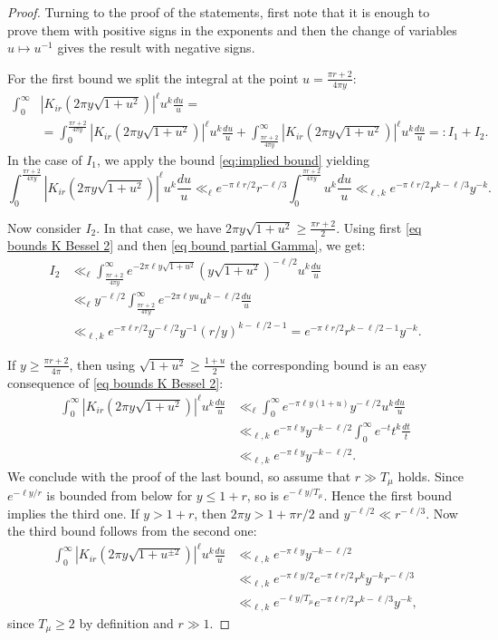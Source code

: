\documentclass[11pt, oneside]{amsart}
\theoremstyle{plain}
\theoremstyle{remark}
\newcommand{\abs}[1]{\left|#1\right|}
\begin{document}
\begin{proof}
Turning to the proof of the statements, first note that it is enough to prove them with positive signs in the exponents and then 
the change of variables $u\mapsto u^{-1}$ gives the result with negative signs. 

 For the first bound we split the integral at the point $u=\frac{\pi r+2}{4\pi y}$:
\begin{align*}
\int_0^\infty&\abs{K_{ir}(2\pi y\sqrt{1+u^2})}^\ell u^k\frac{du}u=\\
&=\int_0^{\frac{\pi r+2}{4\pi y}}\abs{K_{ir}(2\pi y\sqrt{1+u^2})}^\ell u^k\frac{du}u+\int_{\frac{\pi r+2}{4\pi y}}^\infty\abs{K_{ir}(2\pi y\sqrt{1+u^2})}^\ell u^k\frac{du}u=:I_1+I_2.
\end{align*}
In the case of $I_1$,
we apply the bound \eqref{eq:implied bound} yielding
$$\int_0^{\frac{\pi r+2}{4\pi y}}\abs{K_{ir}(2\pi y\sqrt{1+u^2})}^\ell u^k\frac{du}u\ll_\ell
e^{-\pi\ell r/2}r^{-\ell/3}\int_0^{\frac{\pi r+2}{4\pi y}}u^k\frac{du}u
\ll_{\ell,k} e^{-\pi\ell r/2}r^{k-\ell/3}y^{-k}.$$

Now consider $I_2$. In that case, we have $2\pi y\sqrt{1+u^2}\geq\frac{\pi r+2}2$. Using first  \eqref{eq bounds K Bessel 2} and then \eqref{eq bound partial Gamma}, we get:
\begin{align*}
I_2&\ll_\ell\int_{\frac{\pi r+2}{4\pi y}}^\infty e^{-2\pi\ell y\sqrt{1+u^2}}\left(y\sqrt{1+u^2}\right)^{-\ell/2}u^k\frac{du}u\\
&\ll_\ell y^{-\ell/2}\int_{\frac{\pi r+2}{4\pi y}}^\infty e^{-2\pi\ell yu}u^{k-\ell/2}\frac{du}u\\
&\ll_{\ell,k}e^{-\pi\ell r/2}y^{-\ell/2}y^{-1}(r/y)^{k-\ell/2-1} =
e^{-\pi\ell r/2}r^{k-\ell/2-1}y^{-k} .
\end{align*}

If $y\geq\frac{\pi r+2}{4\pi}$, then using $\sqrt{1+u^2}\geq\frac{1+u}2$
the corresponding bound is an easy consequence of \eqref{eq bounds K Bessel 2}:
\begin{align*}
\int_0^\infty\abs{K_{ir}(2\pi y\sqrt{1+u^2})}^\ell u^k\frac{du}u&\ll_\ell\int_0^\infty e^{-\pi\ell y(1+u)}y^{-\ell/2}u^k\frac{du}u\\
    &\ll_{\ell,k}e^{-\pi\ell y}y^{-k-\ell/2}\int_0^\infty e^{-t}t^{k}\frac{dt}t\\
    &\ll_{\ell,k}e^{-\pi\ell y}y^{-k-\ell/2}.
\end{align*}
We conclude with the proof of the last bound, so assume that $r\gg T_\mu$ holds. 
Since $e^{-\ell y/r}$ is bounded from below for 
$ y\leq 1+ r$, so is $e^{-\ell y/ T_\mu}$. Hence the first bound implies the third one. 
If  $y>1+r$, then $2\pi y>1+\pi r/2$ and $y^{-\ell/2}\ll r^{-\ell/3}$. Now the third bound follows from
the second one:
\begin{align*}
\int_0^\infty\abs{K_{ir}(2\pi y\sqrt{1+u^{\pm 2}})}^\ell u^{ k}\frac{du}u&\ll_{\ell,k}e^{-\pi\ell y}y^{-k-\ell/2}\\
    &\ll_{\ell,k}e^{-\pi\ell y/2}e^{-\pi\ell r/2}r^ky^{-k}r^{-\ell/3}\\
     &\ll_{\ell,k}e^{-\ell y/T_\mu}e^{-\pi\ell r/2}r^{k-\ell/3}y^{-k},
\end{align*}
since $T_\mu\geq2$ by definition and $r\gg1$.
\end{proof}
\end{document}
